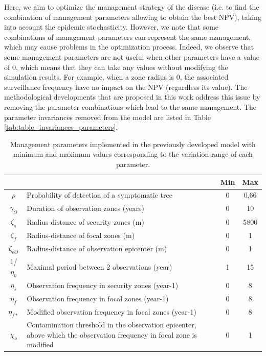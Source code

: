 	Here, we aim to optimize the management strategy of the disease (i.e. to find the combination of management parameters allowing to obtain the best NPV), 
	taking into account the epidemic stochasticity. However, we note that some combinations of management parameters can represent the same management, 
	which may cause problems in the optimization process. Indeed, we observe that some management parameters are not useful when other parameters have a value of 0, 
	which means that they can take any values without modifying the simulation results. For example, when a zone radius is 0, the associated surveillance frequency have no impact on the NPV (regardless its value). 
	The methodological developments that are proposed in this work address this issue by removing the parameter combinations which lead to the same management. 
	The parameter invariances removed from the model are listed in Table \ref{tab:table_invariances_parameters}.
	
	\begin{table}[htbp]
		\centering
		\caption{Management parameters implemented in the previously developed model  with minimum and maximum values corresponding to the variation range of each parameter.}
		\begin{tabular}{|c|p{33.785em}|c|c|}
			\cmidrule{3-4}    \multicolumn{1}{c}{} & \multicolumn{1}{c|}{} & \textbf{Min} & \textbf{Max} \\
			\midrule
			$\rho$    & Probability of detection of a symptomatic tree & 0     & 0,66 \\
			\midrule
			$\gamma_{O}$    & Duration of observation zones (years) & 0     & 10 \\
			\midrule
			$\zeta_{s}$   & Radius-distance of security zones (m) & 0     & 5800 \\
			\midrule
			$\zeta_{f}$  & Radius-distance of focal zones (m) & 0     & 1 \\
			\midrule
			$\zeta_{eO}$ & Radius-distance of observation epicenter (m) & 0     & 1 \\
			\midrule
			1/$\eta_{0}$  & Maximal period between 2 observations (year) & 1     & 15 \\
			\midrule
			$\eta_{s}$    & Observation frequency in security zones (year-1) & 0     & 8 \\
			\midrule
			$\eta_{f}$    & Observation frequency in focal zones (year-1) & 0     & 8 \\
			\midrule
			$\eta_{f*}$   & Modified observation frequency in focal zones (year-1) & 0     & 8 \\
			\midrule
			$\chi_{o}$    & Contamination threshold in the observation epicenter, above which the observation frequency in focal zone is modified & 0     & 1 \\
			\bottomrule
		\end{tabular}%
		\label{tab:tableparameters}%
	\end{table}%
	
